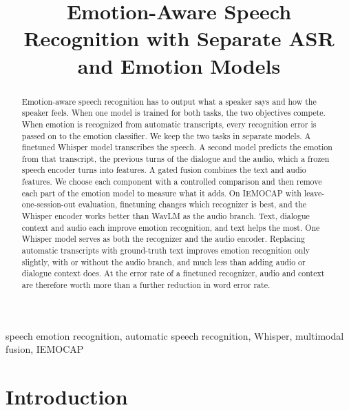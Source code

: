 \documentclass[conference]{IEEEtran}
\begin{document}
\title{Emotion-Aware Speech Recognition with Separate ASR and Emotion Models}

\author{
\and
{}
}

\maketitle

\begin{abstract}
Emotion-aware speech recognition has to output what a speaker says and how the speaker feels. When one model is
trained for both tasks, the two objectives compete. When emotion is recognized from automatic transcripts, every
recognition error is passed on to the emotion classifier. We keep the two tasks in separate models. A finetuned
Whisper model transcribes the speech. A second model predicts the emotion from that transcript, the previous
turns of the dialogue and the audio, which a frozen speech encoder turns into features. A gated fusion combines
the text and audio features. We choose each component with a controlled comparison and then remove each part of the
emotion model to measure what it adds. On IEMOCAP with leave-one-session-out evaluation, finetuning changes which
recognizer is best, and the Whisper encoder works better than WavLM as the audio branch. Text, dialogue context and
audio each improve emotion recognition, and text helps the most. One Whisper model serves as both the recognizer and
the audio encoder. Replacing automatic transcripts with ground-truth text improves emotion recognition only slightly,
with or without the audio branch, and much less than adding audio or dialogue context does. At the error rate of a
finetuned recognizer, audio and context are therefore worth more than a further reduction in word error rate.
\end{abstract}

\begin{IEEEkeywords}
speech emotion recognition, automatic speech recognition, Whisper, multimodal fusion, IEMOCAP
\end{IEEEkeywords}

\section{Introduction}
\end{document}
